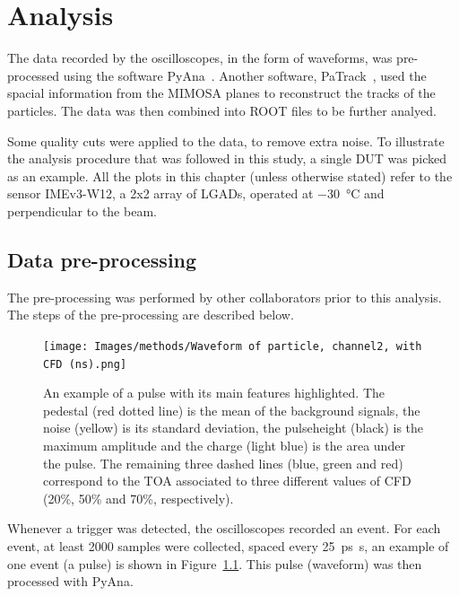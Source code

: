 \chapter{Analysis}\label{chap:methods}

The data recorded by the oscilloscopes, in the form of waveforms, was pre-processed using the software PyAna~\cite{atlas_hgtd_pyana_2025}. Another software, PaTrack~\cite{atlas_hgtd_patrack_2025}, used the spacial information from the MIMOSA planes to reconstruct the tracks of the particles. The data was then combined into ROOT files to be further analyed.


Some quality cuts were applied to the data, to remove extra noise. To illustrate the analysis procedure that was followed in this study, a single DUT was picked as an example. All the plots in this chapter (unless otherwise stated) refer to the sensor IMEv3-W12, a 2x2 array of LGADs, operated at \qty{-30}{\degreeCelsius} and perpendicular to the beam.

\section{Data pre-processing}

The pre-processing was performed by other collaborators prior to this analysis. The steps of the pre-processing are described below.

\begin{figure}[!hb]
    \centering
    \texttt{[image: Images/methods/Waveform of particle, channel2, with CFD (ns).png]}
    \captionsetup{width=.8\linewidth}
    \caption{An example of a pulse with its main features highlighted. The pedestal (red dotted line) is the mean of the background signals, the noise (yellow) is its standard deviation, the pulseheight (black) is the maximum amplitude and the charge (light blue) is the area under the pulse. The remaining three dashed lines (blue, green and red) correspond to the TOA associated to three different values of CFD (20\%, 50\% and 70\%, respectively).}
    \label{fig:waveform_features}
\end{figure} 

Whenever a trigger was detected, the oscilloscopes recorded an event. For each event, at least 2000 samples were collected, spaced every \qty{25}{\ps\second}, an example of one event (a pulse) is shown in Figure~\ref{fig:waveform_features}. This pulse (waveform) was then processed with PyAna.

